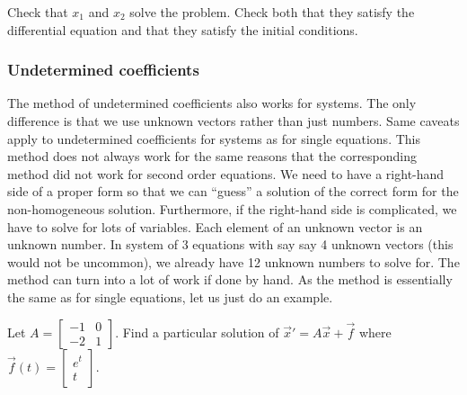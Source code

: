 \begin{exercise}
Check that $x_1$ and $x_2$ solve the problem.  Check both that they satisfy
the differential equation and that they satisfy the initial conditions.
\end{exercise}


\subsubsection{Undetermined coefficients}

The method of
undetermined coefficients also
works for systems.
The only
difference is that we use unknown vectors rather than just
numbers.  Same caveats apply to undetermined coefficients for systems
as for single equations.  This method does not always work for the same reasons that the corresponding method did not work for second order equations. We need to have a right-hand side of a proper form so that we can ``guess'' a solution of the correct form for the non-homogeneous solution.
Furthermore, if the right-hand side is complicated, we have to solve
for lots of
variables.  Each element of an
unknown vector is an unknown number.  In system of 3 equations with say
say 4 unknown vectors (this would not be uncommon), we already have 12
unknown numbers to solve for.
The method can turn into a lot of
work if done by hand.
As the method is essentially the same as for single equations,
let us just do an example.

\begin{example}
Let $A = \left[
\begin{smallmatrix}
-1 & 0 \\
-2 & 1
\end{smallmatrix} \right]$.
Find a particular solution of ${\vec{x}}' = A \vec{x} +
\vec{f}$ where $\vec{f}(t) = 
\left[ \begin{smallmatrix}
e^t \\
t
\end{smallmatrix} \right]$.
\end{example}

